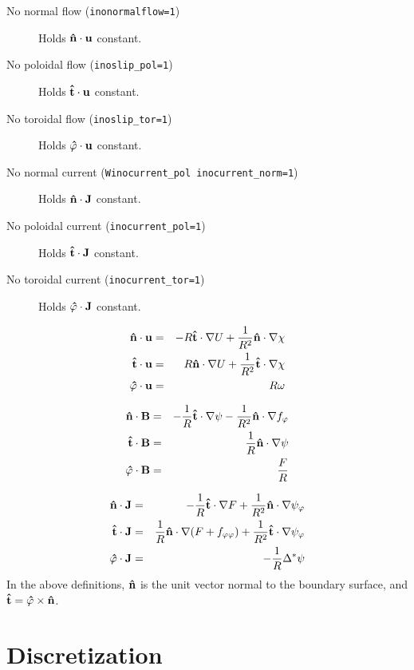 \begin{description}
\item[No normal flow (\texttt{inonormalflow=1})] Holds $\mathbf{\hat{n}} \cdot
  \mathbf{u}$ constant.
\item[No poloidal flow (\texttt{inoslip\_pol=1})] Holds $\mathbf{\hat{t}} \cdot
  \mathbf{u}$ constant.
\item[No toroidal flow (\texttt{inoslip\_tor=1})] Holds $\mathbf{\hat{\varphi}}
  \cdot \mathbf{u}$ constant.
\item[No normal current (\texttt{Winocurrent\_pol
inocurrent\_norm=1})] Holds $\mathbf{\hat{n}} \cdot
  \mathbf{J}$ constant.
\item[No poloidal current (\texttt{inocurrent\_pol=1})] Holds $\mathbf{\hat{t}} \cdot
  \mathbf{J}$ constant.
\item[No toroidal current (\texttt{inocurrent\_tor=1})] Holds $\mathbf{\hat{\varphi}}
  \cdot \mathbf{J}$ constant.
\end{description}

\begin{eqnarray}
  \mathbf{\hat{n}} \cdot \mathbf{u} & = & 
  -R \mathbf{\hat{t}}\cdot\nabla U+ \frac{1}{R^2} \mathbf{\hat{n}} \cdot \nabla \chi
  \\
  \mathbf{\hat{t}} \cdot \mathbf{u} & = & 
  R \mathbf{\hat{n}}\cdot\nabla U + \frac{1}{R^2} \mathbf{\hat{t}} \cdot \nabla \chi
  \\
  \mathbf{\hat{\varphi}} \cdot \mathbf{u} & = & R \omega
\end{eqnarray}

\begin{eqnarray}
  \mathbf{\hat{n}} \cdot \mathbf{B} & = & 
  -\frac{1}{R} \mathbf{\hat{t}}\cdot\nabla \psi
  - \frac{1}{R^2} \mathbf{\hat{n}} \cdot \nabla f_\varphi
  \\
  \mathbf{\hat{t}} \cdot \mathbf{B} & = & 
  \frac{1}{R} \mathbf{\hat{n}}\cdot\nabla \psi 
  \\
  \mathbf{\hat{\varphi}} \cdot \mathbf{B} & = & \frac{F}{R}
\end{eqnarray}

\begin{eqnarray}
  \mathbf{\hat{n}} \cdot \mathbf{J} & = & 
  -\frac{1}{R} \mathbf{\hat{t}} \cdot \nabla F
  + \frac{1}{R^2} \mathbf{\hat{n}} \cdot \nabla \psi_\varphi
  \\
  \mathbf{\hat{t}} \cdot \mathbf{J} & = & 
  \frac{1}{R} \mathbf{\hat{n}}\cdot\nabla (F + f_{\varphi \varphi}) 
  + \frac{1}{R^2} \mathbf{\hat{t}} \cdot \nabla \psi_\varphi
  \\
  \mathbf{\hat{\varphi}} \cdot \mathbf{J} & = & -\frac{1}{R}\Delta^* \psi
\end{eqnarray}
In the above definitions, $\mathbf{\hat{n}}$ is the unit vector normal to the
boundary surface, and $\mathbf{\hat{t}} = \mathbf{\hat{\varphi}} \times \mathbf{\hat{n}}$.


\section{Discretization}

